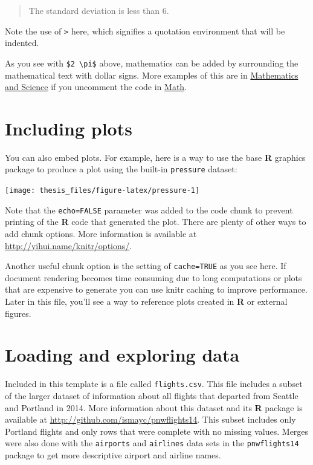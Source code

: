 \documentclass[12pt,twoside]{reedthesis}
\begin{document}
  \begin{quote}
  The standard deviation is less than 6.
  \end{quote}
  
  Note the use of \texttt{\textgreater{}} here, which signifies a
  quotation environment that will be indented.
  
  As you see with \texttt{\$2\ \textbackslash{}pi\$} above, mathematics
  can be added by surrounding the mathematical text with dollar signs.
  More examples of this are in \protect\hyperlink{math-sci}{Mathematics
  and Science} if you uncomment the code in
  \protect\hyperlink{math}{Math}.
  
  \section{Including plots}\label{including-plots}
  
  You can also embed plots. For example, here is a way to use the base
  \textbf{R} graphics package to produce a plot using the built-in
  \texttt{pressure} dataset:
  
  \begin{center}\texttt{[image: thesis\_files/figure-latex/pressure-1]} \end{center}
  
  Note that the \texttt{echo=FALSE} parameter was added to the code chunk
  to prevent printing of the \textbf{R} code that generated the plot.
  There are plenty of other ways to add chunk options. More information is
  available at \url{http://yihui.name/knitr/options/}.
  
  Another useful chunk option is the setting of \texttt{cache=TRUE} as you
  see here. If document rendering becomes time consuming due to long
  computations or plots that are expensive to generate you can use knitr
  caching to improve performance. Later in this file, you'll see a way to
  reference plots created in \textbf{R} or external figures.
  
  \hypertarget{loading-and-exploring-data}{\section{Loading and exploring
  data}\label{loading-and-exploring-data}}
  
  Included in this template is a file called \texttt{flights.csv}. This
  file includes a subset of the larger dataset of information about all
  flights that departed from Seattle and Portland in 2014. More
  information about this dataset and its \textbf{R} package is available
  at \url{http://github.com/ismayc/pnwflights14}. This subset includes
  only Portland flights and only rows that were complete with no missing
  values. Merges were also done with the \texttt{airports} and
  \texttt{airlines} data sets in the \texttt{pnwflights14} package to get
  more descriptive airport and airline names.
  
\end{document}
